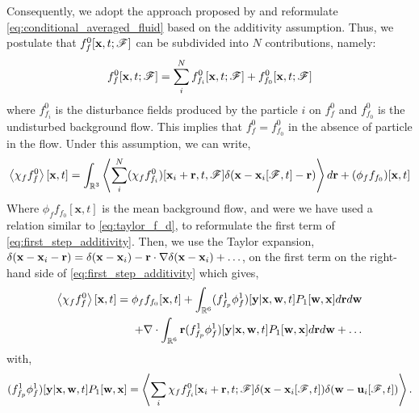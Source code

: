 Consequently, we adopt the approach proposed by \citet{batchelor1972sedimentation} and reformulate \ref{eq:conditional_averaged_fluid} based on the additivity assumption. 
Thus, we postulate that $f_f^0[\textbf{x},t;\mathscr{F}]$ can be subdivided into $N$ contributions, namely:  
\begin{equation}
    f_f^0[\textbf{x},t;\mathscr{F}]
    = 
    \sum_i^N
    f_{f_i}^0[\textbf{x},t;\mathscr{F}]
    + f_{f_0}^0[\textbf{x},t;\mathscr{F}]
\end{equation}
where $f_{f_i}^0$ is the disturbance fields produced by the particle $i$ on $f_f^0$ and $f_{f_0}^0$ is the undisturbed background flow. 
This implies that $f_{f}^0 = f_{f_0}^0$ in the absence of particle in the flow. 
Under this assumption, we can write, 
\begin{equation}
    \avg{\chi_f f_f^0}[\textbf{x},t]
    = 
    \int_{\mathbb{R}^3} 
    \avg{
        \sum_i^N 
    (\chi_f f_{f_i}^0)[\textbf{x}_i + \textbf{r},t,\FF] \delta(\textbf{x} - \textbf{x}_i[\FF,t] - \textbf{r})}d\textbf{r}
    +( \phi_f f_{f_0})[\textbf{x},t]
    \label{eq:first_step_additivity}
\end{equation}
Where $\phi_f f_{f_0}[\textbf{x},t]$ is the mean background flow, and were we have used a relation similar to \ref{eq:taylor_f_d}, to reformulate the first term of \ref{eq:first_step_additivity}. 
Then, we use the Taylor expansion, $\delta(\textbf{x} - \textbf{x}_i - \textbf{r}) =\delta(\textbf{x} - \textbf{x}_i) - \textbf{r}\cdot \mathbf{\nabla}\delta(\textbf{x} - \textbf{x}_i)+ \ldots$, on the first term on the right-hand side of \ref{eq:first_step_additivity} which gives,  
\begin{align}
    \avg{\chi_f f_f^0}[\textbf{x},t]
    = 
    \phi_f f_{f_0}[\textbf{x},t]
    + 
    \int_{\mathbb{R}^6} 
    (f_{f_p}^1\phi_f^1) [\textbf{y}|\textbf{x},\textbf{w},t] P_1[\textbf{w},\textbf{x}]
    d\textbf{r}
    d\textbf{w}\\
    + 
    \div 
    \int_{\mathbb{R}^6} 
    \textbf{r}
    (f_{f_p}^1\phi_f^1) [\textbf{y}|\textbf{x},\textbf{w},t] P_1[\textbf{w},\textbf{x}]
    d\textbf{r}
    d\textbf{w}
    + \ldots
    \label{eq:f_f_1_def}
\end{align}
with, 
\begin{equation}
    (f_{f_p}^1 \phi_f^1) [\textbf{y}|\textbf{x},\textbf{w},t] P_1[\textbf{w},\textbf{x}]
    = 
    \left<
    \sum_i
    \chi_f f_{f_i}^0[\textbf{x}_i + \textbf{r},t;\mathscr{F}] 
    \delta(\textbf{x} - \textbf{x}_i[\mathscr{F},t])
    \delta(\textbf{w} - \textbf{u}_i[\mathscr{F},t])
    \right>. 
\end{equation}
